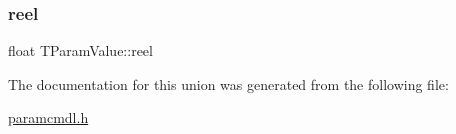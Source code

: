 \mbox{\label{unionTParamValue_a6c6e99a421de592ad46cf47aab9cef58}} 
\subsubsection{\texorpdfstring{reel}{reel}}
{\footnotesize\ttfamily float T\+Param\+Value\+::reel}



The documentation for this union was generated from the following file\+:\begin{DoxyCompactItemize}
\item 
\hyperlink{paramcmdl_8h}{paramcmdl.\+h}\end{DoxyCompactItemize}
